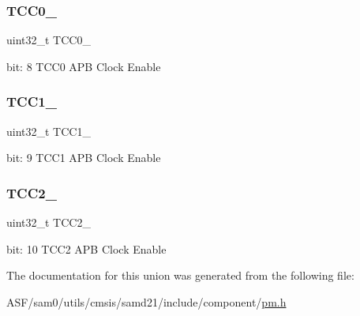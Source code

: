 \subsubsection{\texorpdfstring{TCC0\_}{TCC0\_}}
{\footnotesize\ttfamily uint32\+\_\+t T\+C\+C0\+\_\+}

bit\+: 8 T\+C\+C0 A\+PB Clock Enable \mbox{\label{union_p_m___a_p_b_c_m_a_s_k___type_aaf23cacf1ec80847e7cfb6e6e7c28fe8}} 
\subsubsection{\texorpdfstring{TCC1\_}{TCC1\_}}
{\footnotesize\ttfamily uint32\+\_\+t T\+C\+C1\+\_\+}

bit\+: 9 T\+C\+C1 A\+PB Clock Enable \mbox{\label{union_p_m___a_p_b_c_m_a_s_k___type_a78a459cadc229c32542b9b9f096a29e8}} 
\subsubsection{\texorpdfstring{TCC2\_}{TCC2\_}}
{\footnotesize\ttfamily uint32\+\_\+t T\+C\+C2\+\_\+}

bit\+: 10 T\+C\+C2 A\+PB Clock Enable 

The documentation for this union was generated from the following file\+:\begin{DoxyCompactItemize}
\item 
A\+S\+F/sam0/utils/cmsis/samd21/include/component/\mbox{\hyperlink{component_2pm_8h}{pm.\+h}}\end{DoxyCompactItemize}
